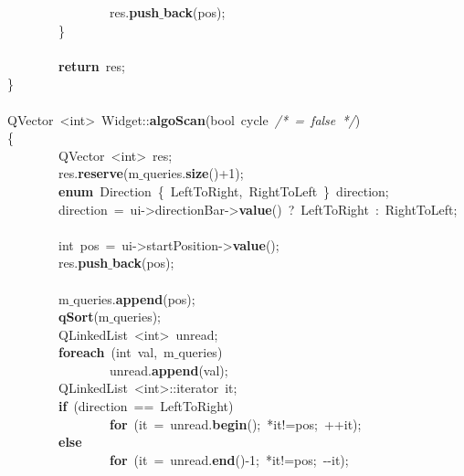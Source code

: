 \mbox{}\ \ \ \ \ \ \ \ \ \ \ \ \ \ \ \ res.\textbf{push$\_$back}(pos); \\
\mbox{}\ \ \ \ \ \ \ \ \} \\
\mbox{} \\
\mbox{}\ \ \ \ \ \ \ \ \textbf{return}\ res; \\
\mbox{}\} \\
\mbox{} \\
\mbox{}QVector\ \textless{}int\textgreater{}\ Widget::\textbf{algoScan}(bool\ cycle\ \textit{/*\ =\ false\ */}) \\
\mbox{}\{ \\
\mbox{}\ \ \ \ \ \ \ \ QVector\ \textless{}int\textgreater{}\ res; \\
\mbox{}\ \ \ \ \ \ \ \ res.\textbf{reserve}(m$\_$queries.\textbf{size}()+1); \\
\mbox{}\ \ \ \ \ \ \ \ \textbf{enum}\ Direction\ \{\ LeftToRight,\ RightToLeft\ \}\ direction; \\
\mbox{}\ \ \ \ \ \ \ \ direction\ =\ ui-\textgreater{}directionBar-\textgreater{}\textbf{value}()\ ?\ LeftToRight\ :\ RightToLeft; \\
\mbox{} \\
\mbox{}\ \ \ \ \ \ \ \ int\ pos\ =\ ui-\textgreater{}startPosition-\textgreater{}\textbf{value}(); \\
\mbox{}\ \ \ \ \ \ \ \ res.\textbf{push$\_$back}(pos); \\
\mbox{} \\
\mbox{}\ \ \ \ \ \ \ \ m$\_$queries.\textbf{append}(pos); \\
\mbox{}\ \ \ \ \ \ \ \ \textbf{qSort}(m$\_$queries); \\
\mbox{}\ \ \ \ \ \ \ \ QLinkedList\ \textless{}int\textgreater{}\ unread; \\
\mbox{}\ \ \ \ \ \ \ \ \textbf{foreach}\ (int\ val,\ m$\_$queries) \\
\mbox{}\ \ \ \ \ \ \ \ \ \ \ \ \ \ \ \ unread.\textbf{append}(val); \\
\mbox{}\ \ \ \ \ \ \ \ QLinkedList\ \textless{}int\textgreater{}::iterator\ it; \\
\mbox{}\ \ \ \ \ \ \ \ \textbf{if}\ (direction\ ==\ LeftToRight) \\
\mbox{}\ \ \ \ \ \ \ \ \ \ \ \ \ \ \ \ \textbf{for}\ (it\ =\ unread.\textbf{begin}();\ *it!=pos;\ ++it); \\
\mbox{}\ \ \ \ \ \ \ \ \textbf{else} \\
\mbox{}\ \ \ \ \ \ \ \ \ \ \ \ \ \ \ \ \textbf{for}\ (it\ =\ unread.\textbf{end}()-1;\ *it!=pos;\ -\/-it); \\
